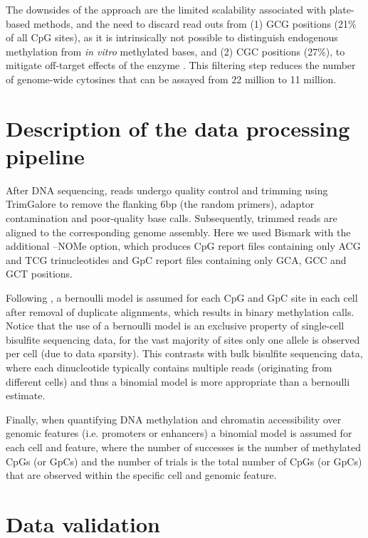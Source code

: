 The downsides of the approach are the limited scalability associated with plate-based methods, and the need to discard read outs from (1) GCG positions (21\% of all CpG sites), as it is intrinsically not possible to distinguish endogenous methylation from \textit{in vitro} methylated bases, and (2) CGC positions (27\%), to mitigate off-target effects of the enzyme \cite{Kelly2012}. This filtering step reduces the number of genome-wide cytosines that can be assayed from 22 million to 11 million. 


\section{Description of the data processing pipeline}

After DNA sequencing, reads undergo quality control and trimming using TrimGalore to remove the flanking 6bp (the random primers), adaptor contamination and poor-quality base calls. Subsequently, trimmed reads are aligned to the corresponding genome assembly. Here we used Bismark \cite{Krueger2011} with the additional --NOMe option, which produces CpG report files containing only ACG and TCG trinucleotides and GpC report files containing only GCA, GCC and GCT positions.

Following \cite{Smallwood2014}, a bernoulli model is assumed for each CpG and GpC site in each cell after removal of duplicate alignments, which results in binary methylation calls. Notice that the use of a bernoulli model is an exclusive property of single-cell bisulfite sequencing data, for the vast majority of sites only one allele is observed per cell (due to data sparsity). This contrasts with bulk bisulfite sequencing data, where each dinucleotide typically contains multiple reads (originating from different cells) and thus a binomial model is more appropriate than a bernoulli estimate.

Finally, when quantifying DNA methylation and chromatin accessibility over genomic features (i.e. promoters or enhancers) a binomial model is assumed for each cell and feature, where the number of successes is the number of methylated CpGs (or GpCs) and the number of trials is the total number of CpGs (or GpCs) that are observed within the specific cell and genomic feature.

\section{Data validation}

